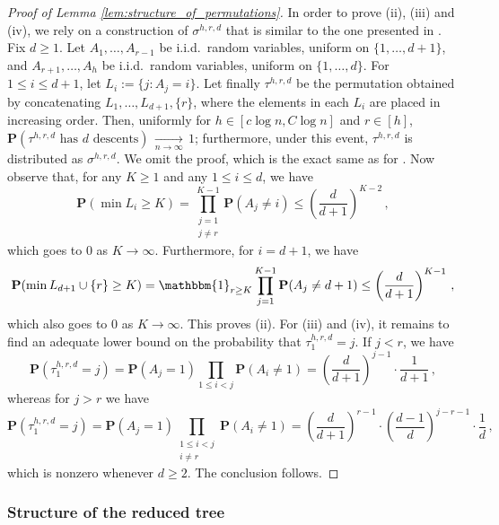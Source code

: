 \documentclass{article}
\theoremstyle{remark}
\newcommand{\cv}[1]{\,\underset{#1}{\longrightarrow}\,}
\newcommand{\prob}[1]{\mathbf{P}{\left(#1\right)}}
\newcommand{\One}[1]{\mathbbm{1}_{#1}}
\begin{document}
\begin{proof}[Proof of Lemma \ref{lem:structure_of_permutations}]
In order to prove (ii), (iii) and (iv), we rely on a construction of $\sigma^{h,r,d}$ that is similar to the one presented in \cite[Lemma~15]{Thevenin_Wagner_2023}. 
Fix $d\ge 1$. 
Let $A_1, \ldots, A_{r-1}$ be i.i.d.~random variables, uniform on $\{1,\ldots,d+1\}$, and $A_{r+1}, \ldots, A_h$ be i.i.d.~random variables, uniform on $\{1,\ldots,d\}$. 
For $1\le i\le d+1$, let $L_i := \{j: A_j = i\}$. 
Let finally $\tau^{h,r,d}$ be the permutation obtained by concatenating $L_1,\ldots,L_{d+1},\{r\}$, where the elements in each $L_i$ are placed in increasing order. 
Then, uniformly for $h \in [c\log n, C\log n]$ and $r \in [h]$, $\prob{\tau^{h,r,d} \text{ has } d \text{ descents}} \cv{n\to\infty} 1$; 
furthermore, under this event, $\tau^{h,r,d}$ is distributed as $\sigma^{h,r,d}$. 
We omit the proof, which is the exact same as for \cite[Lemma~15]{Thevenin_Wagner_2023}.
Now observe that, for any $K \geq 1$ and any $1 \leq i \leq d$, we have
\begin{equation*}
\prob{\min L_i \geq K} 
= \prod\limits_{\substack{j=1 \\ j\ne r}}^{K-1} \prob{A_j \neq i}
\le \left( \frac{d}{d+1} \right)^{K-2} \,,
\end{equation*}
which goes to $0$ as $K \rightarrow \infty$. 
Furthermore, for $i=d+1$, we have 
\begin{align*}
\prob{\min L_{d+1} \cup \{r\} \geq K} 
= \One{r \geq K} \prod\limits_{j=1}^{K-1} \prob{A_j \ne d+1} 
\le \left( \frac{d}{d+1} \right)^{K-1} \,,
\end{align*}
which also goes to $0$ as $K \rightarrow \infty$. 
This proves (ii).
For (iii) and (iv), it remains to find an adequate lower bound on the probability that $\tau^{h,r,d}_1 = j$.
If $j<r$, we have
\begin{equation*}
    \prob{ \tau^{h,r,d}_1 = j }
    = \prob{A_j=1} \prod_{1\le i< j} \prob{A_i \ne 1}
    = \left( \frac{d}{d+1} \right)^{j-1} \cdot \frac{1}{d+1} \,,
\end{equation*}
whereas for $j>r$ we have
\begin{equation*}
    \prob{ \tau^{h,r,d}_1 = j }
    = \prob{A_j=1} \prod_{\substack{1\le i< j\\i\ne r}} \prob{A_i \ne 1}
    = \left( \frac{d}{d+1} \right)^{r-1} \cdot \left( \frac{d-1}{d} \right)^{j-r-1} \cdot \frac{1}{d} \,,
\end{equation*}
which is nonzero whenever $d \geq 2$.
The conclusion follows.
\end{proof}


\subsubsection{Structure of the reduced tree}
\label{sssec:prelim}
\end{document}
